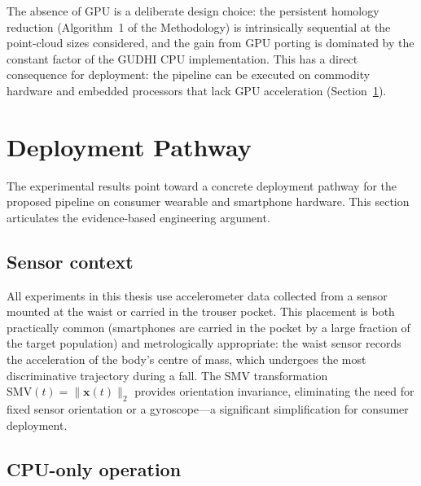 \documentclass[onluarkali,ingilizce,yukseklisans,karton,LisansustuEgitim]{itutez}
\providecommand{\1}{\mathbf{1}}
\begin{document}
The absence of GPU is a deliberate design choice: the persistent homology reduction
(Algorithm~1 of the Methodology) is intrinsically sequential at the point-cloud
sizes considered, and the gain from GPU porting is dominated by the constant factor
of the GUDHI CPU implementation.  This has a direct consequence for deployment:
the pipeline can be executed on commodity hardware and embedded processors that lack
GPU acceleration (Section~\ref{subsec:deployment}).

\section{Deployment Pathway}
\label{subsec:deployment}

The experimental results point toward a concrete deployment pathway for the proposed
pipeline on consumer wearable and smartphone hardware.  This section articulates the
evidence-based engineering argument.

\subsection{Sensor context}

All experiments in this thesis use accelerometer data collected from a sensor mounted
at the waist or carried in the trouser pocket.  This placement is both practically
common (smartphones are carried in the pocket by a large fraction of the target
population) and metrologically appropriate: the waist sensor records the acceleration
of the body's centre of mass, which undergoes the most discriminative trajectory
during a fall.  The SMV transformation $\mathrm{SMV}(t)=\|\mathbf{x}(t)\|_2$ provides
orientation invariance, eliminating the need for fixed sensor orientation or a
gyroscope---a significant simplification for consumer deployment.

\subsection{CPU-only operation}
\end{document}
